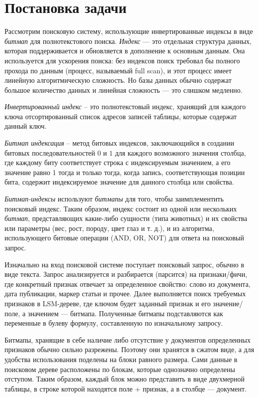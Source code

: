 \newpage
\section{Постановка задачи}

Рассмотрим поисковую систему, использующие инвертированные индексы в виде
\textit{битмап} для полнотекстового поиска.
\textit{Индекс} — это отдельная структура данных, которая поддерживается и
обновляется в дополнение к основным данным.
Она используется для ускорения поиска: без индексов поиск требовал бы полного
прохода по данным (процесс, называемый full scan), и этот процесс имеет линейную
алгоритмическую сложность. Но базы данных обычно содержат большое количество
данных и линейная сложность — это слишком медленно.

\textit{Инвертированный индекс} – это полнотекстовый индекс, хранящий для каждого
ключа отсортированный список адресов записей таблицы, которые содержат данный ключ.

\textit{Битмап индексация} – метод битовых индексов, заключающийся в создании
битовых последовательностей $0$ и $1$ для каждого возможного значения столбца, где
каждому биту соответствует строка с индексируемым значением, а его значение
равно 1 тогда и только тогда, когда запись, соответствующая позиции бита,
содержит индексируемое значение для данного столбца или свойства.

\textit{Битмап-индексы} используют \textit{битмапы} для того, чтобы заимплементить
поисковый индекс. Таким образом, индекс состоит из одной или нескольких
\textit{битмап}, представляющих какие-либо сущности (типа животных) и их свойства
или параметры (вес, рост, породу, цвет глаз и т. д.), и из алгоритма,
использующего битовые операции (AND, OR, NOT) для ответа на поисковый запрос.

Изначально на вход поисковой системе поступает поисковый запрос, обычно в виде
текста. Запрос анализируется и разбирается (парсится) на признаки/фичи,
где конкретный признак отвечает за определенное свойство: слово из документа,
дата публикации, маркер статьи и прочее.
Далее выполняется поиск требуемых признаков в LSM-дереве, где ключом будет заданный
признак и его значение/поле, а значением — битмапа. Полученные битмапы
подставляются как переменные в булеву формулу, составленную по изначальному запросу.

Битмапы, хранящие в себе наличие либо отсутствие у документов определенных признаков 
обычно сильно разрежены. Поэтому они хранятся в сжатом виде, а для удобства
использования поделены на блоки равного размера. Сами данные в поисковом дереве
расположены по блокам, которые однозначно определены отступом. Таким образом,
каждый блок можно представить в виде двухмерной таблицы, в строке которой
находятся поле + признак, а в столбце — документ.

